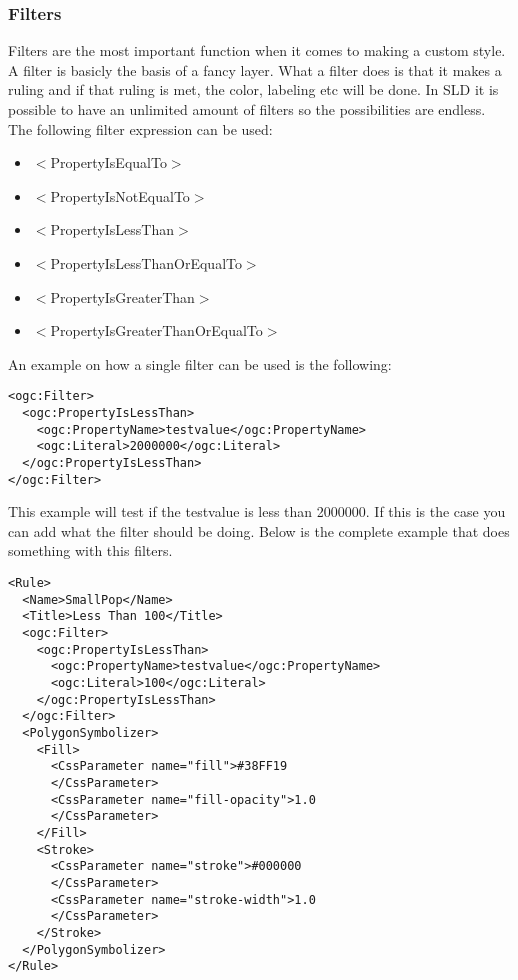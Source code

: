 \subsubsection{Filters}

Filters are the most important function when it comes to making a custom style. A filter is basicly the basis of a fancy layer. What a filter does is that it makes a ruling and if that ruling is met, the color, labeling etc will be done. In SLD it is possible to have an unlimited amount of filters so the possibilities are endless. The following filter expression can be used:

\begin{itemize}
	\item $<$PropertyIsEqualTo$>$
	\item $<$PropertyIsNotEqualTo$>$
	\item $<$PropertyIsLessThan$>$
	\item $<$PropertyIsLessThanOrEqualTo$>$
	\item $<$PropertyIsGreaterThan$>$
	\item $<$PropertyIsGreaterThanOrEqualTo$>$
\end{itemize}

An example on how a single filter can be used is the following:
\begin{lstlisting}
<ogc:Filter>
  <ogc:PropertyIsLessThan>
    <ogc:PropertyName>testvalue</ogc:PropertyName>
    <ogc:Literal>2000000</ogc:Literal>
  </ogc:PropertyIsLessThan>
</ogc:Filter>
\end{lstlisting}

This example will test if the testvalue is less than 2000000. If this is the case you can add what the filter should be doing. Below is the complete example that does something with this filters.
\begin{lstlisting}
<Rule>
  <Name>SmallPop</Name>
  <Title>Less Than 100</Title>
  <ogc:Filter>
    <ogc:PropertyIsLessThan>
      <ogc:PropertyName>testvalue</ogc:PropertyName>
      <ogc:Literal>100</ogc:Literal>
    </ogc:PropertyIsLessThan>
  </ogc:Filter>
  <PolygonSymbolizer>
    <Fill>
      <CssParameter name="fill">#38FF19
      </CssParameter>
      <CssParameter name="fill-opacity">1.0
      </CssParameter>
    </Fill>
    <Stroke>
      <CssParameter name="stroke">#000000
      </CssParameter>
      <CssParameter name="stroke-width">1.0
      </CssParameter>
    </Stroke>
  </PolygonSymbolizer>
</Rule>
\end{lstlisting}

